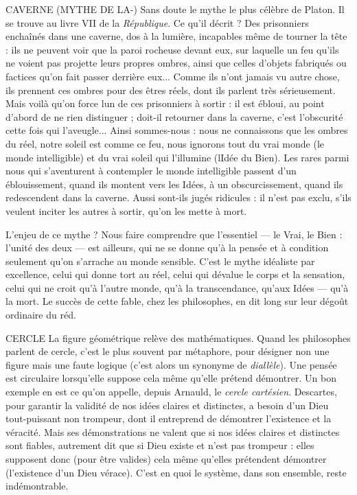CAVERNE (MYTHE DE LA-) Sans doute le mythe le plus célèbre de
Platon. Il se trouve au livre VII de la {\it République}.
Ce qu’il décrit ? Des prisonniers enchaînés dans une caverne, dos à la
lumière, incapables même de tourner la tête : ils ne peuvent voir que la paroi
rocheuse devant eux, sur laquelle un feu qu’ils ne voient pas projette leurs
propres ombres, ainsi que celles d’objets fabriqués ou factices qu’on fait passer
derrière eux... Comme ils n’ont jamais vu autre chose, ils prennent ces ombres
pour des êtres réels, dont ils parlent très sérieusement. Mais voilà qu’on force
lun de ces prisonniers à sortir : il est ébloui, au point d’abord de ne rien
distinguer ; doit-il retourner dans la caverne, c’est l’obscurité cette fois qui
l’aveugle... Ainsi sommes-nous : nous ne connaissons que les ombres du réel,
notre soleil est comme ce feu, nous ignorons tout du vrai monde (le monde
intelligible) et du vrai soleil qui l’illumine (lIdée du Bien). Les rares parmi
nous qui s’aventurent à contempler le monde intelligible passent d’un éblouissement,
quand ils montent vers les Idées, à un obscurcissement, quand ils
redescendent dans la caverne. Aussi sont-ils jugés ridicules : il n’est pas exclu,
s'ils veulent inciter les autres à sortir, qu’on les mette à mort.

L'enjeu de ce mythe ? Nous faire comprendre que l'essentiel — le Vrai, le
Bien : l’unité des deux — est ailleurs, qui ne se donne qu’à la pensée et à condition
seulement qu’on s’arrache au monde sensible. C’est le mythe idéaliste par
excellence, celui qui donne tort au réel, celui qui dévalue le corps et la sensation,
celui qui ne croit qu’à l’autre monde, qu’à la transcendance, qu’aux Idées
— qu'à la mort. Le succès de cette fable, chez les philosophes, en dit long sur
leur dégoût ordinaire du réd.

CERCLE La figure géométrique relève des mathématiques. Quand les philosophes
parlent de cercle, c’est le plus souvent par métaphore,
pour désigner non une figure mais une faute logique (c’est alors un synonyme
de {\it diallèle}). Une pensée est circulaire lorsqu’elle suppose cela même qu’elle prétend
démontrer. Un bon exemple en est ce qu’on appelle, depuis Arnauld, le
{\it cercle cartésien}. Descartes, pour garantir la validité de nos idées claires et distinctes,
a besoin d’un Dieu tout-puissant non trompeur, dont il entreprend de
démontrer l'existence et la véracité. Mais ses démonstrations ne valent que si
nos idées claires et distinctes sont fiables, autrement dit que si Dieu existe et
n’est pas trompeur : elles supposent donc (pour être valides) cela même qu’elles
prétendent démontrer (l'existence d’un Dieu vérace). C’est en quoi le système,
dans son ensemble, reste indémontrable.

